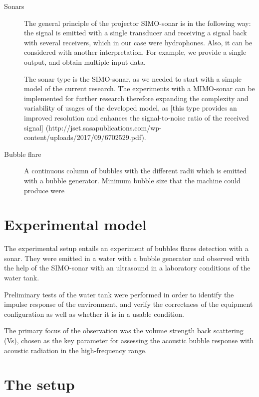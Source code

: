 \begin{description}
	\item[Sonars] 

    The general principle of the projector SIMO-sonar is in the following way:  the signal is emitted with a single transducer and receiving a signal back with several receivers, which in our case were hydrophones. Also, it can be considered with another interpretation. For example, we provide a single output, and obtain multiple input data.
    
    The sonar type is the SIMO-sonar, as we needed to start with a simple model of the current research. The experiments with a MIMO-sonar can be implemented for further research therefore expanding the complexity and variability of usages of the developed model, as [this type provides an improved resolution and enhances the signal-to-noise ratio of the received signal] (http://jset.sasapublications.com/wp-content/uploads/2017/09/6702529.pdf).
    
	\item[Bubble flare] 

    A continuous column of bubbles with the different radii which is emitted with a bubble generator. Minimum bubble size that the machine could produce were 
	\item[] 
    
\end{description} 

\section{Experimental model}

The experimental setup entails an experiment of bubbles flares detection with a sonar. They were emitted in a water with a bubble generator and observed with the help of the SIMO-sonar with an ultrasound in a laboratory conditions of the water tank. 

Preliminary tests of the water tank were performed in order to identify the impulse response of the  environment, and verify the correctness of the equipment configuration as well as whether it is in a usable condition.

The primary focus of the observation was the volume strength back scattering (Vs), chosen as the key parameter for assessing the acoustic bubble response with acoustic radiation in the high-frequency range. 

\section{ The setup}

